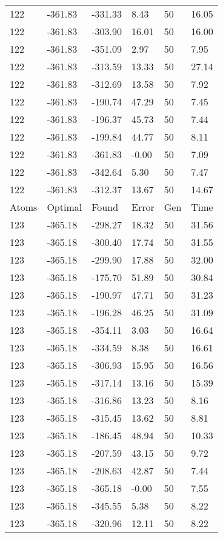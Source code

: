 \documentclass{report}
\begin{document}
\begin{appendix}
\begin{longtable}{llllll}
122 & -361.83 & -331.33 & 8.43 & 50 & 16.05 \\
122 & -361.83 & -303.90 & 16.01 & 50 & 16.00 \\
122 & -361.83 & -351.09 & 2.97 & 50 & 7.95 \\
122 & -361.83 & -313.59 & 13.33 & 50 & 27.14 \\
122 & -361.83 & -312.69 & 13.58 & 50 & 7.92 \\
122 & -361.83 & -190.74 & 47.29 & 50 & 7.45 \\
122 & -361.83 & -196.37 & 45.73 & 50 & 7.44 \\
122 & -361.83 & -199.84 & 44.77 & 50 & 8.11 \\
122 & -361.83 & -361.83 & -0.00 & 50 & 7.09 \\
122 & -361.83 & -342.64 & 5.30 & 50 & 7.47 \\
122 & -361.83 & -312.37 & 13.67 & 50 & 14.67 \\
Atoms & Optimal & Found & Error & Gen & Time \\
123 & -365.18 & -298.27 & 18.32 & 50 & 31.56 \\
123 & -365.18 & -300.40 & 17.74 & 50 & 31.55 \\
123 & -365.18 & -299.90 & 17.88 & 50 & 32.00 \\
123 & -365.18 & -175.70 & 51.89 & 50 & 30.84 \\
123 & -365.18 & -190.97 & 47.71 & 50 & 31.23 \\
123 & -365.18 & -196.28 & 46.25 & 50 & 31.09 \\
123 & -365.18 & -354.11 & 3.03 & 50 & 16.64 \\
123 & -365.18 & -334.59 & 8.38 & 50 & 16.61 \\
123 & -365.18 & -306.93 & 15.95 & 50 & 16.56 \\
123 & -365.18 & -317.14 & 13.16 & 50 & 15.39 \\
123 & -365.18 & -316.86 & 13.23 & 50 & 8.16 \\
123 & -365.18 & -315.45 & 13.62 & 50 & 8.81 \\
123 & -365.18 & -186.45 & 48.94 & 50 & 10.33 \\
123 & -365.18 & -207.59 & 43.15 & 50 & 9.72 \\
123 & -365.18 & -208.63 & 42.87 & 50 & 7.44 \\
123 & -365.18 & -365.18 & -0.00 & 50 & 7.55 \\
123 & -365.18 & -345.55 & 5.38 & 50 & 8.22 \\
123 & -365.18 & -320.96 & 12.11 & 50 & 8.22 \\

\end{longtable}
\end{appendix}
\end{document}
